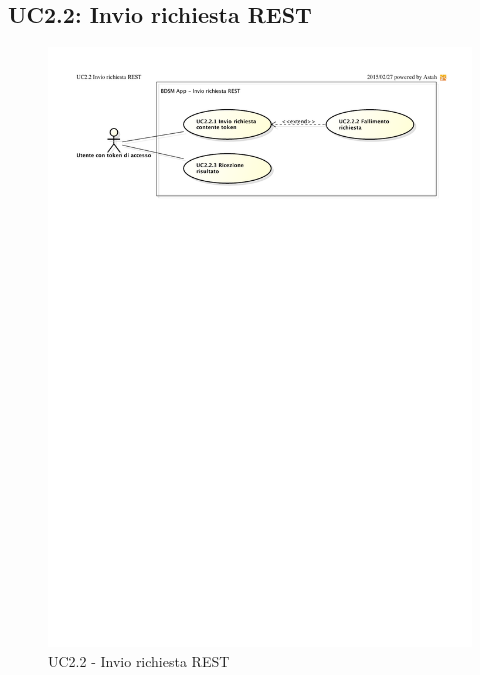 \subsection{UC2.2: Invio richiesta REST}
\begin{figure}[htbp]
	\centering
	\centerline{\includegraphics{./images/UC2_2.pdf}}
	\caption{UC2.2 - Invio richiesta REST}
\end{figure}

